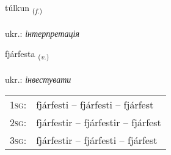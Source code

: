 \documentclass[frontgrid, backgrid]{flacards}\usepackage[]{graphicx}\usepackage[]{xcolor}
\begin{document}
\renewcommand{\flhead}{\vskip5pt \fboxsep=0pt {\small\bfseries\footnotesize Nafnorð | іменник}}
\renewcommand{\fcfoot}{\vskip5pt \fboxsep=0pt \hspace{2pt}{\small\bfseries\footnotesize 2K}}

\renewcommand{\blhead}{\vskip5pt {\small\bfseries\footnotesize Nafnorð | іменник }}
\renewcommand{\bcfoot}{\vskip5pt \hspace{2pt}{\small\bfseries\footnotesize 2K}}


{túlkun \small{\textsubscript{(\textit{f.})}} \\[1ex] %
 \\
ukr.: \emph{інтерпретація} \\  [2ex]
\renewcommand*{\arraystretch}{0.8}
}

\renewcommand{\flhead}{\vskip5pt \fboxsep=0pt {\small\bfseries\footnotesize Sagnorð | дієслово}}
\renewcommand{\fcfoot}{\vskip5pt \fboxsep=0pt \hspace{2pt}{\small\bfseries\footnotesize 2K}}

\renewcommand{\blhead}{\vskip5pt {\small\bfseries\footnotesize Sagnorð | дієслово }}
\renewcommand{\bcfoot}{\vskip5pt \hspace{2pt}{\small\bfseries\footnotesize 2K}}


{fjárfesta \small{\textsubscript{(\textit{v.})}} \\[1ex] %
 \\
ukr.: \emph{інвестувати} \\  [2ex]
\renewcommand*{\arraystretch}{0.8}
\begin{tabular}{p{1cm}l}
\textsc{1sg}: & fjárfesti -- fjárfesti -- fjárfest \\ 
\textsc{2sg}: & fjárfestir -- fjárfestir -- fjárfest \\ 
\textsc{3sg}: & fjárfestir -- fjárfesti -- fjárfest \\ 
\end{tabular}
}
\end{document}
